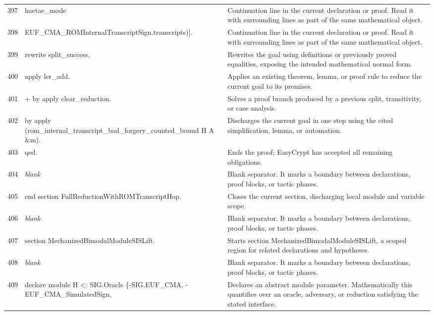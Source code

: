 \documentclass[10pt]{article}
\begin{document}
\begin{longtable}{r L{0.53\textwidth} L{0.37\textwidth}}
397 & {\ttfamily\scriptsize                             haetae\_mode} & Continuation line in the current declaration or proof.  Read it with surrounding lines as part of the same mathematical object. \\
398 & {\ttfamily\scriptsize                             EUF\_CMA\_ROMInternalTranscriptSign.transcripts)].} & Continuation line in the current declaration or proof.  Read it with surrounding lines as part of the same mathematical object. \\
399 & {\ttfamily\scriptsize rewrite split\_success.} & Rewrites the goal using definitions or previously proved equalities, exposing the intended mathematical normal form. \\
400 & {\ttfamily\scriptsize apply ler\_add.} & Applies an existing theorem, lemma, or proof rule to reduce the current goal to its premises. \\
401 & {\ttfamily\scriptsize + by apply clear\_reduction.} & Solves a proof branch produced by a previous split, transitivity, or case analysis. \\
402 & {\ttfamily\scriptsize by apply (rom\_internal\_transcript\_bad\_forgery\_counted\_bound H A \&m).} & Discharges the current goal in one step using the cited simplification, lemma, or automation. \\
403 & {\ttfamily\scriptsize qed.} & Ends the proof; EasyCrypt has accepted all remaining obligations. \\
404 & {\ttfamily\scriptsize \emph{blank}} & Blank separator.  It marks a boundary between declarations, proof blocks, or tactic phases. \\
405 & {\ttfamily\scriptsize end section FullReductionWithROMTranscriptHop.} & Closes the current section, discharging local module and variable scope. \\
406 & {\ttfamily\scriptsize \emph{blank}} & Blank separator.  It marks a boundary between declarations, proof blocks, or tactic phases. \\
407 & {\ttfamily\scriptsize section MechanizedBimodalModuleSISLift.} & Starts section MechanizedBimodalModuleSISLift, a scoped region for related declarations and hypotheses. \\
408 & {\ttfamily\scriptsize \emph{blank}} & Blank separator.  It marks a boundary between declarations, proof blocks, or tactic phases. \\
409 & {\ttfamily\scriptsize declare module H <: SIG.Oracle \{-SIG.EUF\_CMA, -EUF\_CMA\_SimulatedSign,} & Declares an abstract module parameter.  Mathematically this quantifies over an oracle, adversary, or reduction satisfying the stated interface. \\

\end{longtable}
\end{document}
